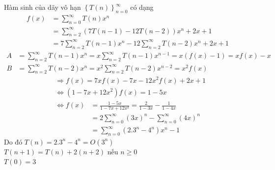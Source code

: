 \documentclass[12pt, a4paper, fleqn]{article}
\begin{document}
Hàm sinh của dãy vô hạn $\left\{T(n)\right\}_{n = 0}^ {\infty}$ có dạng
\setlength{\abovedisplayskip}{3pt}%
\setlength{\belowdisplayskip}{3pt}%
\begin{align*}
f(x) &= \sum_{n = 0} ^ {\infty}T(n)x^ n\\
	 &= \sum_{n = 2} ^ {\infty}(7T(n - 1) - 12T(n - 2))x^ n + 2x + 1\\
	 &= 7\sum_{n = 2} ^ {\infty}T(n - 1)x^ n - 12\sum_{n = 2} ^ {\infty}T(n - 2)x^ n + 2x + 1
\end{align*}
\setlength{\abovedisplayskip}{3pt}%
\setlength{\belowdisplayskip}{3pt}%
\begin{align*}
A &= \sum_{n = 2} ^ {\infty}T(n - 1)x^ n = x\sum_{n = 2} ^ {\infty}T(n - 1)x^ {n - 1} = x(f(x) - 1) = xf(x) - x\\
B &= \sum_{n = 2} ^ {\infty}T(n - 2)x^ n = x ^ 2\sum_{n = 2} ^ {\infty}T(n - 2)x^ {n - 2} = x ^ 2f(x)
\end{align*}
\setlength{\abovedisplayskip}{3pt}%
\setlength{\belowdisplayskip}{3pt}%
\begin{align*}
&\Rightarrow f(x) = 7xf(x) - 7x - 12x ^ 2f(x) + 2x + 1\\
& \Leftrightarrow(1 - 7x + 12x ^ 2)f(x) = 1 - 5x
\end{align*}
\setlength{\abovedisplayskip}{3pt}%
\setlength{\belowdisplayskip}{3pt}%
\begin{align*}
\Leftrightarrow f(x) &= \frac{1 - 5x}{1 - 7x + 12x ^ 2} = \frac{2}{1 - 3x}-\frac{1}{1 - 4x}\\
					 &= 2\sum_{n = 0} ^ {\infty}(3x) ^ n - \sum_{n = 0} ^ {\infty}(4x) ^ n\\
					 &= \sum_{n = 0} ^ {\infty}(2.3 ^ n - 4 ^ n)x^ n - 1
\end{align*}
Do đó $T(n) = 2.3 ^ n - 4 ^ n = O\left(3 ^ n\right)$\\
	
$T(n + 1) = T(n) + 2(n + 2)$ nếu $n \geq 0$\\
$T(0) = 3$
	
\end{document}
